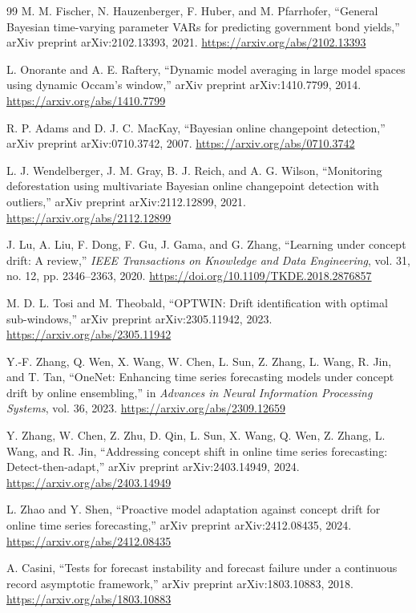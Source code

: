 \documentclass[review,number,sort&compress]{elsarticle}
\begin{document}
\begin{thebibliography}{99}
M. M. Fischer, N. Hauzenberger, F. Huber, and M. Pfarrhofer, ``General Bayesian time-varying parameter VARs for predicting government bond yields,'' arXiv preprint arXiv:2102.13393, 2021. \url{https://arxiv.org/abs/2102.13393}

L. Onorante and A. E. Raftery, ``Dynamic model averaging in large model spaces using dynamic Occam's window,'' arXiv preprint arXiv:1410.7799, 2014. \url{https://arxiv.org/abs/1410.7799}

R. P. Adams and D. J. C. MacKay, ``Bayesian online changepoint detection,'' arXiv preprint arXiv:0710.3742, 2007. \url{https://arxiv.org/abs/0710.3742}

L. J. Wendelberger, J. M. Gray, B. J. Reich, and A. G. Wilson, ``Monitoring deforestation using multivariate Bayesian online changepoint detection with outliers,'' arXiv preprint arXiv:2112.12899, 2021. \url{https://arxiv.org/abs/2112.12899}

J. Lu, A. Liu, F. Dong, F. Gu, J. Gama, and G. Zhang, ``Learning under concept drift: A review,'' \emph{IEEE Transactions on Knowledge and Data Engineering}, vol. 31, no. 12, pp. 2346--2363, 2020. \url{https://doi.org/10.1109/TKDE.2018.2876857}

M. D. L. Tosi and M. Theobald, ``OPTWIN: Drift identification with optimal sub-windows,'' arXiv preprint arXiv:2305.11942, 2023. \url{https://arxiv.org/abs/2305.11942}

Y.-F. Zhang, Q. Wen, X. Wang, W. Chen, L. Sun, Z. Zhang, L. Wang, R. Jin, and T. Tan, ``OneNet: Enhancing time series forecasting models under concept drift by online ensembling,'' in \emph{Advances in Neural Information Processing Systems}, vol. 36, 2023. \url{https://arxiv.org/abs/2309.12659}

Y. Zhang, W. Chen, Z. Zhu, D. Qin, L. Sun, X. Wang, Q. Wen, Z. Zhang, L. Wang, and R. Jin, ``Addressing concept shift in online time series forecasting: Detect-then-adapt,'' arXiv preprint arXiv:2403.14949, 2024. \url{https://arxiv.org/abs/2403.14949}

L. Zhao and Y. Shen, ``Proactive model adaptation against concept drift for online time series forecasting,'' arXiv preprint arXiv:2412.08435, 2024. \url{https://arxiv.org/abs/2412.08435}

A. Casini, ``Tests for forecast instability and forecast failure under a continuous record asymptotic framework,'' arXiv preprint arXiv:1803.10883, 2018. \url{https://arxiv.org/abs/1803.10883}


\end{thebibliography}
\end{document}
